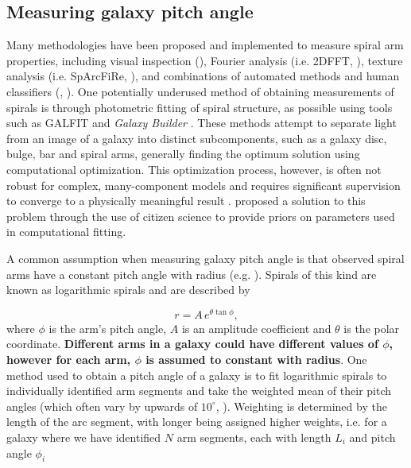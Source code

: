 \label{section:method}

\subsection{Measuring galaxy pitch angle} 
Many methodologies have been proposed and implemented to measure spiral arm properties, including visual inspection (\citealt{2015A&A...582A..86H}), Fourier analysis (i.e. \textsc{2DFFT}, \citealt{2012ApJS..199...33D}), texture analysis (i.e. SpArcFiRe, \citealt{2014ApJ...790...87D}), and combinations of automated methods and human classifiers (\citealt{2017MNRAS.472.2263H}, \citealt{2020MNRAS.493.3854H}). One potentially underused method of obtaining measurements of spirals is through photometric fitting of spiral structure, as possible using tools such as \textsc{GALFIT} \citep{2010AJ....139.2097P} and \textit{Galaxy Builder} \citep{2020arXiv200610450L}. These methods attempt to separate light from an image of a galaxy into distinct subcomponents, such as a galaxy disc, bulge, bar and spiral arms, generally finding the optimum solution using computational optimization. This optimization process, however, is often not robust for complex, many-component models and requires significant supervision to converge to a physically meaningful result \citep{Gao2017:1709.00746v1}. \citet{2020arXiv200610450L} proposed a solution to this problem through the use of citizen science to provide priors on parameters used in computational fitting.

A common assumption when measuring galaxy pitch angle is that observed spiral arms have a constant pitch angle with radius (e.g. \citealt{2012ApJS..199...33D,2013MNRAS.436.1074S,2014ApJ...790...87D}). Spirals of this kind are known as logarithmic spirals and are described by

\begin{equation}
  \label{eq:log-spiral}
r = A\,e^{\theta\tan\phi},
\end{equation}
%
where $\phi$ is the arm's pitch angle, $A$ is an amplitude coefficient and $\theta$ is the polar coordinate. \textbf{Different arms in a galaxy could have different values of $\phi$, however for each arm, $\phi$ is assumed to constant with radius}. One method used to obtain a pitch angle of a galaxy is to fit logarithmic spirals to individually identified arm segments and take the weighted mean of their pitch angles (which often vary by upwards of $10^\circ$, \citealt{2014ApJ...790...87D}). Weighting is determined by the length of the arc segment, with longer being assigned higher weights, i.e. for a galaxy where we have identified $N$ arm segments, each with length $L_i$ and pitch angle $\phi_i$

